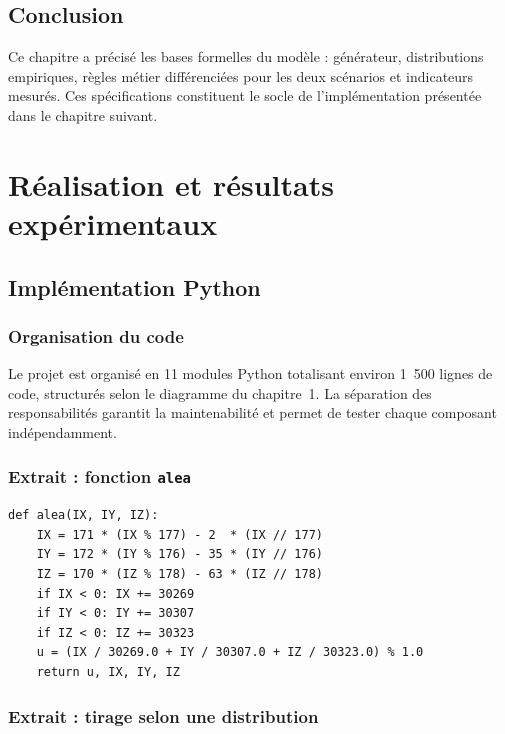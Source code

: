 \documentclass[12pt,a4paper,oneside]{report}
\newcommand{\code}[1]{\texttt{\color{primary}#1}}
\begin{document}
\section{Conclusion}

Ce chapitre a précisé les bases formelles du modèle : générateur,
distributions empiriques, règles métier différenciées pour les deux
scénarios et indicateurs mesurés. Ces spécifications constituent le
socle de l'implémentation présentée dans le chapitre suivant.

\chapter{Réalisation et résultats expérimentaux}

\section{Implémentation Python}

\subsection{Organisation du code}

Le projet est organisé en 11 modules Python totalisant environ
1~500 lignes de code, structurés selon le diagramme du chapitre~1.
La séparation des responsabilités garantit la maintenabilité et permet
de tester chaque composant indépendamment.

\subsection{Extrait : fonction \code{alea}}

\begin{lstlisting}[caption={Générateur Wichmann-Hill (alea.py).},label={lst:alea}]
def alea(IX, IY, IZ):
    IX = 171 * (IX % 177) - 2  * (IX // 177)
    IY = 172 * (IY % 176) - 35 * (IY // 176)
    IZ = 170 * (IZ % 178) - 63 * (IZ // 178)
    if IX < 0: IX += 30269
    if IY < 0: IY += 30307
    if IZ < 0: IZ += 30323
    u = (IX / 30269.0 + IY / 30307.0 + IZ / 30323.0) % 1.0
    return u, IX, IY, IZ
\end{lstlisting}

\subsection{Extrait : tirage selon une distribution}
\end{document}
